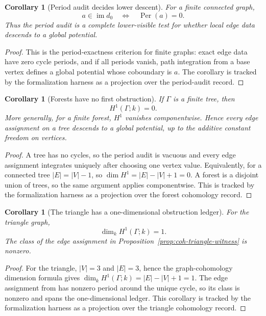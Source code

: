\documentclass[11pt]{article}
\newcommand{\im}{\operatorname{im}}
\newcommand{\Per}{\operatorname{Per}}
\newtheorem{corollary}[theorem]{Corollary}
\theoremstyle{definition}
\begin{document}
\begin{corollary}[Period audit decides lower descent]
\label{cor:coh-period-audit-decides}
For a finite connected graph,
\[
a\in\im d_0
\quad\Longleftrightarrow\quad
\Per(a)=0.
\]
Thus the period audit is a complete lower-visible test for whether local edge data descends to a global potential.
\end{corollary}

\begin{proof}
This is the period-exactness criterion for finite graphs: exact edge data have
zero cycle periods, and if all periods vanish, path integration from a base
vertex defines a global potential whose coboundary is \(a\).  The corollary is
tracked by the formalization harness as a projection over the period-audit
record.
\end{proof}

\begin{corollary}[Forests have no first obstruction]
\label{cor:coh-forest-vanishing}
If \(\Gamma\) is a finite tree, then
\[
H^1(\Gamma;k)=0.
\]
More generally, for a finite forest, \(H^1\) vanishes componentwise.  Hence every edge assignment on a tree descends to a global potential, up to the additive constant freedom on vertices.
\end{corollary}

\begin{proof}
A tree has no cycles, so the period audit is vacuous and every edge assignment
integrates uniquely after choosing one vertex value.  Equivalently, for a
connected tree \(|E|=|V|-1\), so \(\dim H^1=|E|-|V|+1=0\).  A forest is a
disjoint union of trees, so the same argument applies componentwise.  This is
tracked by the formalization harness as a projection over the forest
cohomology record.
\end{proof}

\begin{corollary}[The triangle has a one-dimensional obstruction ledger]
\label{cor:coh-triangle-h1}
For the triangle graph,
\[
\dim_k H^1(\Gamma;k)=1.
\]
The class of the edge assignment in Proposition~\ref{prop:coh-triangle-witness} is nonzero.
\end{corollary}

\begin{proof}
For the triangle, \(|V|=3\) and \(|E|=3\), hence the graph-cohomology dimension
formula gives \(\dim_k H^1(\Gamma;k)=|E|-|V|+1=1\).  The edge assignment from
 has nonzero period around the unique cycle, so
its class is nonzero and spans the one-dimensional ledger.  This corollary is
tracked by the formalization harness as a projection over the triangle
cohomology record.
\end{proof}
\end{document}
